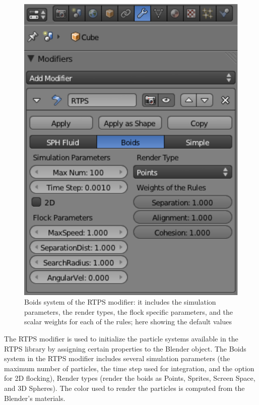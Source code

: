 \begin{figure}[htbp]
\begin{center}
\includegraphics[scale=0.8]{figures/modifier.pdf}
\caption{Boids system of the RTPS modifier: it includes the simulation parameters, the render types, the flock specific parameters, and the scalar weights for each of the rules; here showing the default values}
\label{ui}
\end{center}
\end{figure}

The RTPS modifier is used to initialize the particle systems available in the RTPS library by assigning certain properties to the Blender object. The Boids system in the RTPS modifier includes several simulation parameters (the maximum number of particles, the time step used for integration, and the option for 2D flocking), Render types (render the boids as Points, Sprites, Screen Space, and 3D Spheres). The color used to render the particles is computed  from the Blender's materials.


